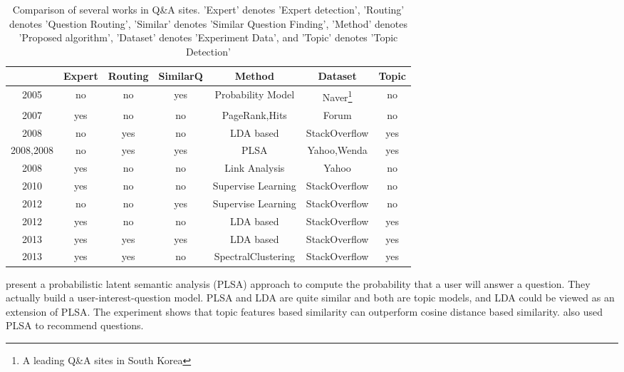 \begin{sidewaystable}%
\centering
\begin{tabular}{|c|c|c|c|c|c|c|}
\hline
&Expert & Routing &SimilarQ& Method & Dataset &Topic   \\
\hline
\cite{chp2jeon2005finding} 2005&no&no&yes&Probability Model&Naver\footnote{A leading Q\&A sites in South Korea} & no \\
\hline
 \cite{zhang2007expertise} 2007& yes &no& no& PageRank,Hits&Forum&no  \\
\hline
\cite{Guo:2008:TPQ:1458082.1458204} 2008 & no&yes&no&LDA based&StackOverflow&yes\\
\hline
\cite{chp2Qu:2009:WWW:PLSA:SimlarQ} 2008,\cite{chp2Wu:2008:PLSA:SimlarQ}2008  & no&yes&yes&PLSA&Yahoo,Wenda & yes \\
\hline
\cite{chp2Bouguessa:2008:Identify:authority:indegree} 2008 & yes&no&no&Link Analysis&Yahoo&no\\
\hline
\cite{chp2Pal:2010:Expert:evolution} 2010&yes&no&no&Supervise Learning&StackOverflow&no \\
\hline
\cite{anderson2012discovering} 2012& no&no&yes&Supervise Learning&StackOverflow&no \\
\hline
\cite{chp2Zhou:2012:TPM:2396761.2398493} 2012 & yes & no & no&LDA based &StackOverflow&yes\\
\hline
\cite{yang2013cqarank} 2013& yes&yes&yes& LDA based&StackOverflow&yes   \\
\hline
\cite{Chang:2013}2013 & yes&yes&no& SpectralClustering&StackOverflow&yes  \\
\hline
\end{tabular}
\caption{Comparison of several works in Q\&A sites. 'Expert' denotes 'Expert detection', 'Routing' denotes 'Question Routing', 'Similar' denotes 'Similar Question Finding', 'Method' denotes 'Proposed algorithm', 'Dataset' denotes 'Experiment Data', and 'Topic' denotes 'Topic Detection'}
\label{tab:workcompare}
\end{sidewaystable}


\cite{chp2Qu:2009:WWW:PLSA:SimlarQ} 
present a probabilistic latent semantic analysis (PLSA) approach to compute the probability that a user will answer a question. 
They actually build a user-interest-question model. PLSA and LDA are quite similar and both are topic models, and LDA could be viewed as an extension of PLSA. The experiment shows that topic features based similarity can outperform cosine distance based similarity. \cite{chp2Wu:2008:PLSA:SimlarQ} also used PLSA to recommend questions.






